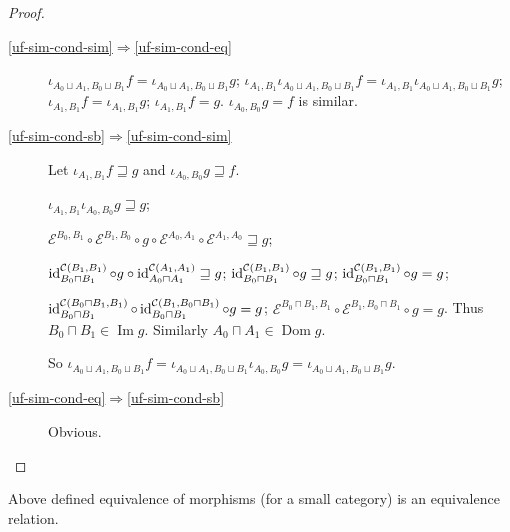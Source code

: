 \begin{proof}
~
\begin{description}
\item[\ref{uf-sim-cond-sim}$\Rightarrow$\ref{uf-sim-cond-eq}]
$\iota_{A_0\sqcup A_1,B_0\sqcup B_1}f=\iota_{A_0\sqcup A_1,B_0\sqcup B_1}g$;
$\iota_{A_1,B_1}\iota_{A_0\sqcup A_1,B_0\sqcup B_1}f=\iota_{A_1,B_1}\iota_{A_0\sqcup A_1,B_0\sqcup B_1}g$;
$\iota_{A_1,B_1}f=\iota_{A_1,B_1}g$;
$\iota_{A_1,B_1}f=g$. $\iota_{A_0,B_0}g=f$ is similar.

\item[\ref{uf-sim-cond-sb}$\Rightarrow$\ref{uf-sim-cond-sim}]
Let $\iota_{A_1, B_1} f \sqsupseteq g$ and $\iota_{A_0, B_0} g \sqsupseteq f$.

$\iota_{A_1, B_1} \iota_{A_0, B_0} g \sqsupseteq g$;

$\mathcal{E}^{B_0, B_1} \circ \mathcal{E}^{B_1, B_0} \circ g \circ
\mathcal{E}^{A_0, A_1} \circ \mathcal{E}^{A_1, A_0}\sqsupseteq g$;

$\operatorname{id}^{\mathcal{C} (B_1, B_1)}_{B_0 \sqcap B_1} \circ g \circ
\operatorname{id}^{\mathcal{C} (A_1, A_1)}_{A_0 \sqcap A_1} \sqsupseteq g$;
$\operatorname{id}^{\mathcal{C} (B_1, B_1)}_{B_0 \sqcap B_1} \circ g \sqsupseteq g$;
$\operatorname{id}^{\mathcal{C} (B_1, B_1)}_{B_0 \sqcap B_1} \circ g = g$;

$\operatorname{id}^{\mathcal{C} (B_0 \sqcap B_1, B_1)}_{B_0 \sqcap B_1} \circ
\operatorname{id}^{\mathcal{C} (B_1, B_0 \sqcap B_1)}_{B_0 \sqcap B_1} \circ g = g$;
$\mathcal{E}^{B_0 \sqcap B_1, B_1} \circ \mathcal{E}^{B_1, B_0 \sqcap B_1}
\circ g = g$. Thus $B_0 \sqcap B_1 \in \operatorname{Im} g$. Similarly $A_0 \sqcap A_1
\in \operatorname{Dom} g$.

So $\iota_{A_0 \sqcup A_1, B_0 \sqcup B_1} f = \iota_{A_0 \sqcup A_1, B_0
\sqcup B_1} \iota_{A_0, B_0} g = \iota_{A_0 \sqcup A_1, B_0 \sqcup B_1} g$.

\item[\ref{uf-sim-cond-eq}$\Rightarrow$\ref{uf-sim-cond-sb}]
Obvious.
\end{description}
\end{proof}

\begin{prop}
Above defined equivalence of morphisms (for a small category)
is an equivalence relation.
\end{prop}

